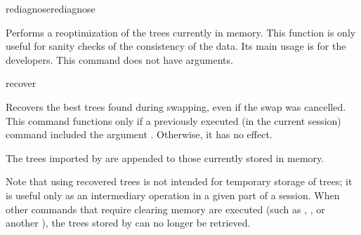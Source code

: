 \begin{command}{rediagnose}{rediagnose}

	\syntax{\obligatory{()}}

	\begin{poydescription}
        Performs a reoptimization of the trees currently in memory. This
        function is only useful for sanity checks of the consistency of the data.
        Its main usage is for the \poy developers. This command does not have
        arguments.
	\end{poydescription}

    \begin{poyexamples}
    \end{poyexamples}

\end{command}

\begin{command}{recover}{}
    \syntax{\obligatory{()}}

    \begin{poydescription}
            Recovers the best trees found during swapping, even if the swap was
            cancelled. This command functions only if a previously executed 
            (in the current \poy session) command  included
	the argument . Otherwise, it has no effect.
	
	The trees imported by  are appended to those currently
	stored in memory.
	
	Note that using recovered trees is not intended for temporary storage of trees;
	it is useful only as an intermediary operation in a given part of a \poy session. When
	other commands that require clearing memory are executed (such as
	, , or another
	),
	the trees stored by  can no longer be retrieved.
            
    \end{poydescription}

    \begin{poyexamples}
    \end{poyexamples}

    \begin{poyalso}
    \end{poyalso}
\end{command}

